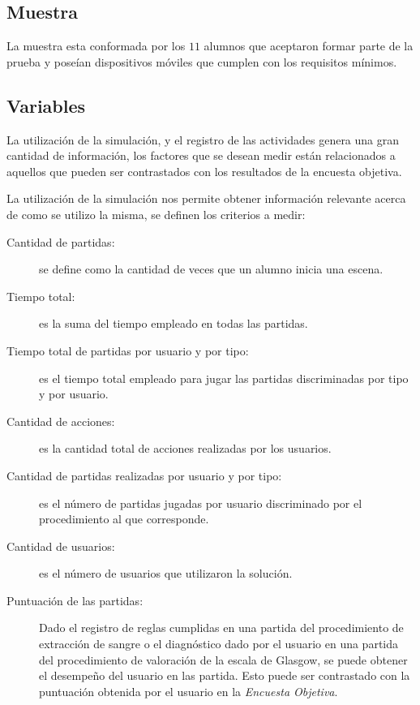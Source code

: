 \subsection{Muestra}

La muestra esta conformada por los $11$ alumnos que aceptaron formar parte de 
la prueba y poseían dispositivos móviles que cumplen con los requisitos
mínimos.

\subsection{Variables}

La utilización de la simulación, y el registro de las actividades genera una
gran cantidad de información, los factores que se desean medir están
relacionados a aquellos que pueden ser contrastados con los resultados de la
encuesta objetiva.

La utilización de la simulación nos permite obtener información relevante acerca
de como se utilizo la misma, se definen los criterios a medir:

\begin{description}

\item[Cantidad de partidas:] se define como la cantidad de veces que un alumno
    inicia una escena. 

\item[Tiempo total:] es la suma del tiempo empleado en todas las partidas.

\item[Tiempo total de partidas por usuario y por tipo:] es el tiempo total 
    empleado para jugar las partidas discriminadas por tipo y por usuario.

\item[Cantidad de acciones:] es la cantidad total de acciones realizadas por 
    los usuarios.
 
\item[Cantidad de partidas realizadas por usuario y por tipo:] es el número de 
    partidas jugadas por usuario discriminado por el procedimiento al que 
    corresponde.

\item[Cantidad de usuarios:] es el número de usuarios que utilizaron la solución.
    
\item[Puntuación de las partidas:] Dado el registro de reglas cumplidas en una partida 
    del procedimiento de extracción de sangre o el diagnóstico dado por el usuario 
    en una partida del procedimiento de valoración de la escala de Glasgow, se 
    puede obtener el desempeño del usuario en las partida. Esto puede ser contrastado 
    con la puntuación obtenida por el usuario en la \emph{Encuesta Objetiva}.


\end{description}

